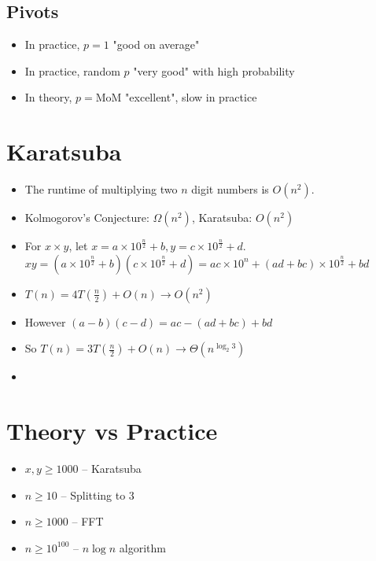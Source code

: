\documentclass[12pt]{article}
\begin{document}
\subsection{Pivots}
\begin{itemize}
    \item In practice, $p = 1$ "good on average"
    \item In practice, random $p$ "very good" with high probability
    \item In theory, $p = \text{MoM}$ "excellent", slow in practice
\end{itemize}

\section{Karatsuba}
\begin{itemize}
    \item The runtime of multiplying two $n$ digit numbers is $O(n^2)$.
    \item Kolmogorov's Conjecture: $\Omega(n^2)$, Karatsuba: $O(n^2)$
    \item For $x \times y$, let $x = a \times 10^{\frac{n}{2}} + b, y = c \times 10^{\frac{n}{2}} + d$. \\
    $xy = (a \times 10^{\frac{n}{2}} + b)(c \times 10^{\frac{n}{2}} + d) = ac \times 10^n + (ad + bc) \times 10^{\frac{n}{2}} + bd$
    \item $T(n) = 4T(\frac{n}{2}) + O(n) \rightarrow O(n^2)$
    \item However $(a - b)(c - d) = ac - (ad + bc) + bd$
    \item So $T(n) = 3T(\frac{n}{2}) + O(n) \rightarrow \Theta(n^{\log_2 3})$
    \item[] 
\end{itemize}

\section{Theory vs Practice}
\begin{itemize}
    \item $x, y \geq 1000$ -- Karatsuba
    \item $n \geq 10$ -- Splitting to 3
    \item $n \geq 1000$ -- FFT
    \item $n \geq 10^{100}$ -- $n\log n$ algorithm
\end{itemize}
\end{document}
